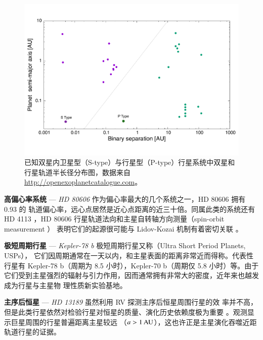 \begin{figure}[t]
\centering
\includegraphics[width=1.0\textwidth]{figures/chapter1/fig13_binaryplanet.pdf}
\caption{已知双星内卫星型（S-type）与行星型（P-type）行星系统中双星和行星轨道半长径分布图，数据来自 \url{http://openexoplanetcatalogue.com}。}
\label{fig:pibinary}
\end{figure}

\textbf{高偏心率系统} --- \textit{HD 80606}  {}  作为偏心率最大的几个系统之一，HD 80606 拥有 0.93 的
轨道偏心率\cite{Naef2001}，远心点居然是近心点距离的近三十倍。同属此类的系统还有 HD 4113
\cite{Tamuz2008}，HD 80606 行星轨道法向和主星自转轴方向测量（spin-orbit measurement ）
\cite{Pont2009}表明它们的起源很可能与 Lidov-Kozai 机制\cite{Lidov1962,Kozai1962}有着密切关联
\cite{Wu2003}。

\textbf{极短周期行星} --- \textit{Kepler-78 b}  {}  极短周期行星又称（Ultra Short Period Planets, USPs），
它们因周期通常在一天以内，和主星表面的距离非常近而得称。代表性行星有 Kepler-78 b（周期为 
8.5 小时\cite{SanchisOjeda2013}），Kepler-70 b（周期仅 5.8 小时\cite{Charpinet2011}）等。由于
它们受到主星强烈的辐射与引力作用，因而通常拥有非常大的密度，近年来也越发成为行星与主星物
理性质新实验基地\cite{Lopez2016,Moutou2016}。

\textbf{主序后恒星} --- \textit{HD 13189}\cite{Hatzes2005}  {}  虽然利用 RV 探测主序后恒星周围行星的效
率并不高\cite{Sato2005}，但是此类行星依然对检验行星对恒星的质量、演化历史依赖度极为重要
\cite{Kennedy2008,Johnson2007b,Jones2014}。观测显示巨星周围的行星普遍距离主星较远
（$a > 1\,\mathrm{AU}$），这也许正是主星演化吞噬近距轨道行星的证据\cite{Johnson2007a,Bowler2010}。


